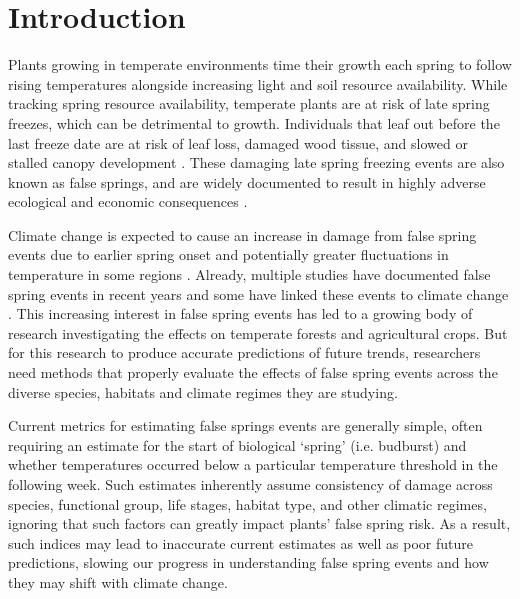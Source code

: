 \documentclass{article}\usepackage[]{graphicx}\usepackage[]{color}
\begin{document}
\section{Introduction}

Plants growing in temperate environments time their growth each spring to follow rising temperatures alongside increasing light and soil resource availability. While tracking spring resource availability, temperate plants are at risk of late spring freezes, which can be detrimental to growth. Individuals that leaf out before the last freeze date are at risk of leaf loss, damaged wood tissue, and slowed or stalled canopy development \citep{Gu2008, Hufkens2012}. These damaging late spring freezing events are also known as false springs, and are widely documented to result in highly adverse ecological and economic consequences \citep{Knudson2012, Ault2013}.

Climate change is expected to cause an increase in damage from false spring events due to earlier spring onset and potentially greater fluctuations in temperature in some regions \citep{Cannell1986, Inouye2008, Martin2010}. Already, multiple studies have documented false spring events in recent years \citep{Gu2008, Augspurger2009, Knudson2012, Augspurger2013} and some have linked these events to climate change \citep{Ault2013, Allstadt2015, Muffler2016, Xin2016}. This increasing interest in false spring events has led to a growing body of research investigating the effects on temperate forests and agricultural crops. But for this research to produce accurate predictions of future trends, researchers need methods that properly evaluate the effects of false spring events across the diverse species, habitats and climate regimes they are studying. 

Current metrics for estimating false springs events are generally simple, often requiring an estimate for the start of biological `spring' (i.e. budburst) and whether temperatures occurred below a particular temperature threshold in the following week. Such estimates inherently assume consistency of damage across species, functional group, life stages, habitat type, and other climatic regimes, ignoring that such factors can greatly impact plants' false spring risk. As a result, such indices may lead to inaccurate current estimates as well as poor future predictions, slowing our progress in understanding false spring events and how they may shift with climate change. 
\end{document}
